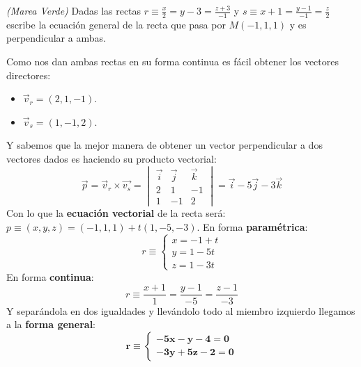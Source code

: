 \documentclass[a4paper,11pt,answers]{exam}
\begin{document}
\begin{questions}
\question \textit{(Marea Verde)} Dadas las rectas $r \equiv \frac{x}{2} = y -3 = \frac{z + 3}{-1}$ y $s \equiv x+1=\frac{y-1}{-1}=
\frac{z}{2}$ escribe la ecuación general de la recta que pasa por $M(-1,1,1)$ y es perpendicular a ambas.
\begin{solution}
Como nos dan ambas rectas en su forma continua es fácil obtener los vectores directores:
\begin{itemize}
	\item $\vec{v}_r = (2,1,-1)$.
	\item $\vec{v}_s =(1,-1,2)$.
\end{itemize}
Y sabemos que la mejor manera de obtener un vector perpendicular a dos vectores dados es haciendo su producto vectorial:
\[\vec p = \vec{v}_r \times \vec{v_s} = \begin{vmatrix}
\vec i&\vec{j}&\vec{k}\\2&1&-1\\1&-1&2
\end{vmatrix} = \vec{i}-5\vec{j}-3\vec{k}
\]
Con lo que la \textbf{ecuación vectorial} de la recta será: $p \equiv (x,y,z) = (-1,1,1) + t (1,-5,-3)$.
En forma \textbf{paramétrica}:
\[r \equiv \begin{cases}
x= -1 + t\\
y=1 -5t\\
z=1 - 3t
\end{cases}\]
En forma \textbf{continua}:
\[r \equiv \frac{x+1}{1} = \frac{y-1}{-5} = \frac{z-1}{-3}\]
Y separándola en dos igualdades y llevándolo todo al miembro izquierdo llegamos a la \textbf{forma general}:
\[\boldsymbol{r \equiv \begin{cases}
-5x -y -4 = 0\\
-3y + 5z -2 = 0
\end{cases}}\]
\end{solution}


\end{questions}
\end{document}
